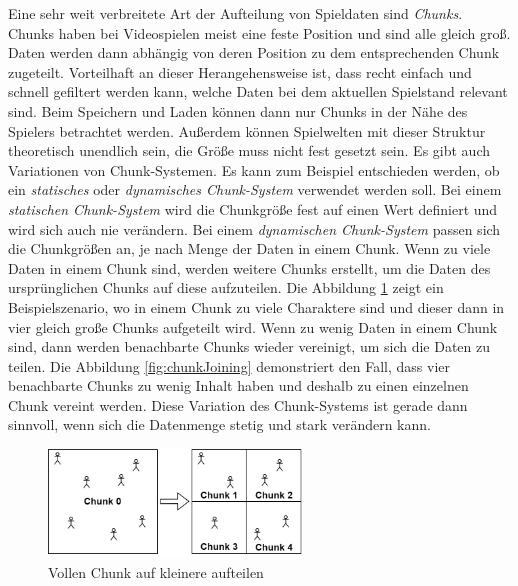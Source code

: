 Eine sehr weit verbreitete Art der Aufteilung von Spieldaten sind \textit{Chunks}. Chunks haben bei Videospielen meist eine feste Position und sind alle gleich groß. Daten werden dann abhängig von deren Position zu dem entsprechenden Chunk zugeteilt. Vorteilhaft an dieser Herangehensweise ist, dass recht einfach und schnell gefiltert werden kann, welche Daten bei dem aktuellen Spielstand relevant sind. Beim Speichern und Laden können dann nur Chunks in der Nähe des Spielers betrachtet werden. Außerdem können Spielwelten mit dieser Struktur theoretisch unendlich sein, die Größe muss nicht fest gesetzt sein. Es gibt auch Variationen von Chunk-Systemen. Es kann zum Beispiel entschieden werden, ob ein \textit{statisches} oder \textit{dynamisches Chunk-System} verwendet werden soll. Bei einem \textit{statischen Chunk-System} wird die Chunkgröße fest auf einen Wert definiert und wird sich auch nie verändern. Bei einem \textit{dynamischen Chunk-System} passen sich die Chunkgrößen an, je nach Menge der Daten in einem Chunk. Wenn zu viele Daten in einem Chunk sind, werden weitere Chunks erstellt, um die Daten des ursprünglichen Chunks auf diese aufzuteilen. Die Abbildung \ref{fig:chunkSplitting} zeigt ein Beispielszenario, wo in einem Chunk zu viele Charaktere sind und dieser dann in vier gleich große Chunks aufgeteilt wird. Wenn zu wenig Daten in einem Chunk sind, dann werden benachbarte Chunks wieder vereinigt, um sich die Daten zu teilen. Die Abbildung \ref{fig:chunkJoining} demonstriert den Fall, dass vier benachbarte Chunks zu wenig Inhalt haben und deshalb zu einen einzelnen Chunk vereint werden. Diese Variation des Chunk-Systems ist gerade dann sinnvoll, wenn sich die Datenmenge stetig und stark verändern kann. 

\begin{figure}[htp]
    \centering
    \includegraphics[width=0.6\textwidth]{images/chunkSplitting.png}
    \caption{Vollen Chunk auf kleinere aufteilen}
    \label{fig:chunkSplitting}
\end{figure}

